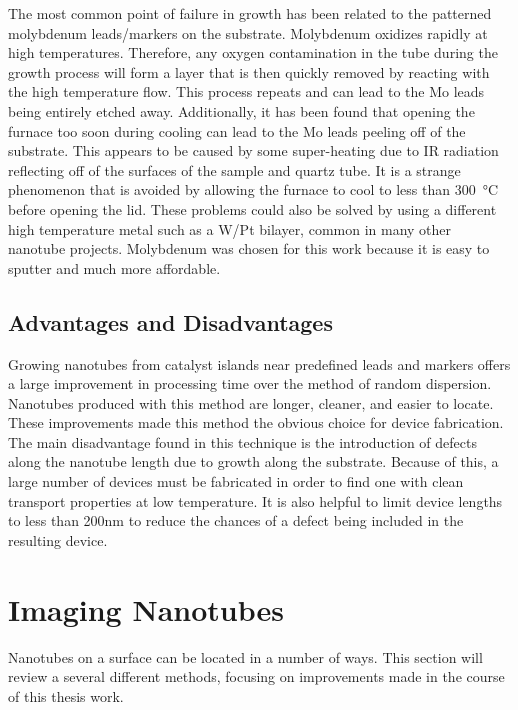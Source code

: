 The most common point of failure in growth has been related to the patterned molybdenum leads/markers on the substrate. Molybdenum oxidizes rapidly at high temperatures. Therefore, any oxygen contamination in the tube during the growth process will form a  layer that is then quickly removed by reacting with the high temperature  flow. This process repeats and can lead to the Mo leads being entirely etched away. Additionally, it has been found that opening the furnace too soon during cooling can lead to the Mo leads peeling off of the substrate. This appears to be caused by some super-heating due to IR radiation reflecting off of the surfaces of the sample and quartz tube. It is a strange phenomenon that is avoided by allowing the furnace to cool to less than \SI{300}{\degreeCelsius} before opening the lid. These problems could also be solved by using a different high temperature metal such as a W/Pt bilayer, common in many other nanotube projects. Molybdenum was chosen for this work because it is easy to sputter and much more affordable.

\subsection{Advantages and Disadvantages}

Growing nanotubes from catalyst islands near predefined leads and markers offers a large improvement in processing time over the method of random dispersion. Nanotubes produced with this method are longer, cleaner, and easier to locate. These improvements made this method the obvious choice for device fabrication. The main disadvantage found in this technique is the introduction of defects along the nanotube length due to growth along the substrate. Because of this, a large number of devices must be fabricated in order to find one with clean transport properties at low temperature. It is also helpful to limit device lengths to less than 200nm to reduce the chances of a defect being included in the resulting device.

\section{Imaging Nanotubes}
\label{subsubsec:imaging_disperse}

Nanotubes on a  surface can be located in a number of ways. This section will review a several different methods, focusing on improvements made in the course of this thesis work.

